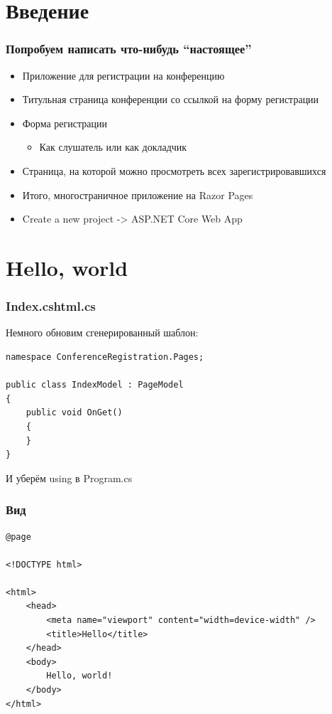 \documentclass{../../slides-style}
\begin{document}
    \begin{frame}[plain]
        \titlepage
    \end{frame}

    \section{Введение}

    \begin{frame}
        \frametitle{Попробуем написать что-нибудь ``настоящее''}
        \begin{itemize}
            \item Приложение для регистрации на конференцию
            \item Титульная страница конференции со ссылкой на форму регистрации
            \item Форма регистрации
            \begin{itemize}
                \item Как слушатель или как докладчик
            \end{itemize}
            \item Страница, на которой можно просмотреть всех зарегистрировавшихся
            \item Итого, многостраничное приложение на Razor Pages
            \item Create a new project -> ASP.NET Core Web App
        \end{itemize}
    \end{frame}

    \section{Hello, world}

    \begin{frame}[fragile]
        \frametitle{Index.cshtml.cs}
        Немного обновим сгенерированный шаблон:
        \begin{verbatim}
namespace ConferenceRegistration.Pages;

public class IndexModel : PageModel
{
    public void OnGet()
    {
    }
}
        \end{verbatim}
        И уберём using в Program.cs
    \end{frame}

    \begin{frame}[fragile]
        \frametitle{Вид}
        \begin{verbatim}
@page

<!DOCTYPE html>

<html>
    <head>
        <meta name="viewport" content="width=device-width" />
        <title>Hello</title>
    </head>
    <body>
        Hello, world!
    </body>
</html>
        \end{verbatim}
    \end{frame}
\end{document}
